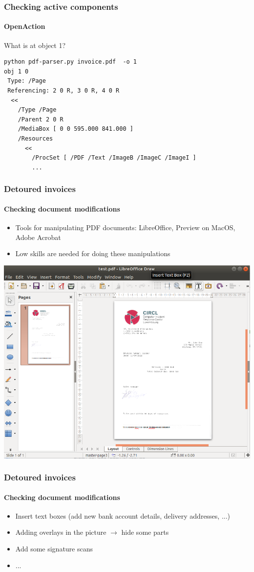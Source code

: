 \begin{frame}[fragile]
\frametitle{Checking active components}
\framesubtitle{OpenAction}
What is at object 1?
\small
\begin{lstlisting}
python pdf-parser.py invoice.pdf  -o 1
obj 1 0
 Type: /Page
 Referencing: 2 0 R, 3 0 R, 4 0 R
  <<
    /Type /Page
    /Parent 2 0 R
    /MediaBox [ 0 0 595.000 841.000 ]
    /Resources
      <<
        /ProcSet [ /PDF /Text /ImageB /ImageC /ImageI ]
        ...
\end{lstlisting}
\end{frame}

\begin{frame}
    \frametitle{Detoured invoices}
    \framesubtitle{Checking document modifications}

    \begin{itemize}
        \item Tools for manipulating PDF documents: LibreOffice, Preview  on MacOS, Adobe Acrobat
        \item Low skills are needed for doing these manipulations
    \end{itemize}
    \begin{center}
        \includegraphics[scale=0.2]{libreoffice.png}
    \end{center}
\end{frame}


\begin{frame}
    \frametitle{Detoured invoices}
    \framesubtitle{Checking document modifications}

    \begin{itemize}
	\item Insert text boxes (add new bank account details, delivery addresses, ...)
	\item Adding overlays in the picture $\to$ hide some parts
	\item Add some signature scans
	\item ...
    \end{itemize}
\end{frame}

